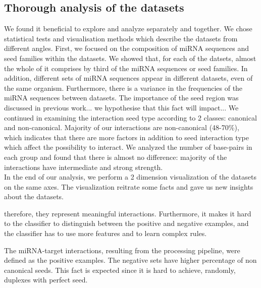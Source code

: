 \documentclass{bmcart}
\begin{document}
\subsection*{Thorough analysis of the datasets}
We found it beneficial to explore and analyze separately and together. We chose  statistical tests and visualisation methods which describe the datasets from different angles.
First, we focused on the composition of miRNA sequences and seed families within the datasets. We showed that, for each of the datsets, almost the whole of it comprises by third of the miRNA sequences or seed families.  In addition, different sets of miRNA sequences appear in different datasets, even of the same organism. Furthermore, there is a variance in the frequencies of the miRNA sequences between datasets.
The importance of the seed region was discussed in previous work... we hypothesise that this fact will impact...
We continued in examining the interaction seed type according to 2 classes: canonical and non-canonical. Majority of our interactions are non-canonical (48-70\%), which indicates that there are more factors in addition to seed interaction type which affect the possibility to interact. We analyzed the number of base-pairs in each group and found that there is almost no difference: majority of the interactions have intermediate and strong strength. \\
In the end of our analysis, we perform a 2 dimension visualization of the datasets on the same axes. The visualization reitrate some facts and gave us new insights about the datasets.





 therefore, they represent meaningful interactions. Furthermore, it makes it hard to the classifier to distinguish between the positive and negative examples, and the classifier has to use more features and to learn complex rules.

The miRNA-target interactions, resulting from the processing pipeline, were defined as the positive examples.
The negative sets have higher percentage of non canonical seeds. This fact is expected since it is hard to achieve, randomly, duplexes with perfect seed.
\end{document}
